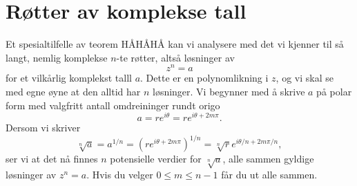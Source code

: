 \section*{Røtter av komplekse tall}
Et spesialtilfelle av teorem HÅHÅHÅ kan vi analysere med det vi kjenner til så langt, nemlig komplekse $n$-te røtter, altså løsninger av 
\[
z^n=a
\]
for et vilkårlig komplekst talll $a$. Dette er en polynomlikning i $z$, og vi skal se med egne øyne at den alltid har $n$ løsninger. Vi begynner med å skrive $a$ på polar form med valgfritt antall omdreininger rundt origo
\[
a = re^{i \theta}=re^{i \theta+2m\pi}.
\]
Dersom vi skriver 
\[
\sqrt[n]{a}=a^{1/n} = (re^{i \theta+2m\pi})^{1/n}=\sqrt[n]{r}e^{i \theta/n+2m\pi/n},
\]
ser vi at det nå finnes $n$ potensielle verdier for $\sqrt[n]{a}$, alle sammen gyldige løsninger av $z^n=a$. Hvis du velger $0\leq m \leq n-1$ får du ut alle sammen. 
